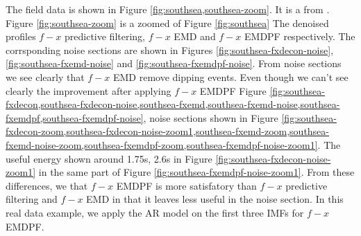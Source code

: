The field data is shown in Figure \ref{fig:southsea,southsea-zoom}. It is a  from . Figure \ref{fig:southsea-zoom} is a  zoomed  of Figure \ref{fig:southsea}   The denoised profiles  $f-x$ predictive filtering, $f-x$ EMD\wen{,} and $f-x$ EMDPF\wen{,} respectively. The corrsponding noise sections are shown in Figures \ref{fig:southsea-fxdecon-noise}, \ref{fig:southsea-fxemd-noise}\wen{,} and \ref{fig:southsea-fxemdpf-noise}. From  noise sections\wen{,}  we see clearly that $f-x$ EMD remove  dipping events. Even though we can't see clearly the improvement after applying $f-x$ EMDPF Figure \ref{fig:southsea-fxdecon,southsea-fxdecon-noise,southsea-fxemd,southsea-fxemd-noise,southsea-fxemdpf,southsea-fxemdpf-noise},  noise sections shown in Figure \ref{fig:southsea-fxdecon-zoom,southsea-fxdecon-noise-zoom1,southsea-fxemd-zoom,southsea-fxemd-noise-zoom,southsea-fxemdpf-zoom,southsea-fxemdpf-noise-zoom1}. The useful energy shown around 1.75s, 2.6s in Figure \ref{fig:southsea-fxdecon-noise-zoom1}  in the same part of Figure \ref{fig:southsea-fxemdpf-noise-zoom1}.  From these differences, we  that $f-x$ EMDPF is more satisfatory than $f-x$ predictive filtering and $f-x$ EMD\wen{,} in that it leaves less useful  in the noise section. In this real data example, we apply the AR model on the first three IMFs for $f-x$ EMDPF. 

